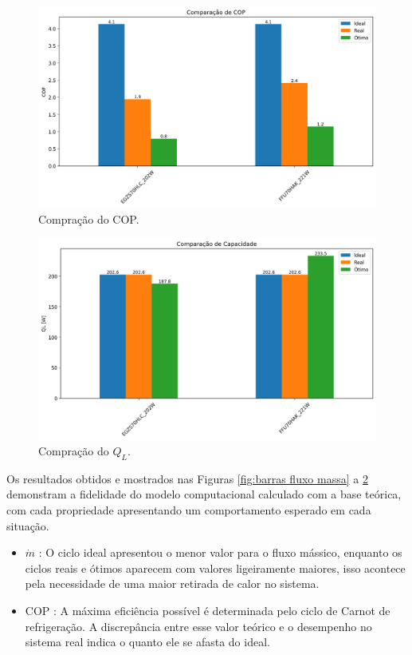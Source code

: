 \newpage

\begin{figure}[ht]
    \centering
    \includegraphics[width=0.8\linewidth]{Imagens/Desenvolvimento/barras_COP.png}
    \caption{Compração do COP.}
    \label{fig:barras COP}
\end{figure}

\begin{figure}[ht]
    \centering
    \includegraphics[width=0.8\linewidth]{Imagens/Desenvolvimento/barras_QL.png}
    \caption{Compração do $Q_L$.}
    \label{fig:barras Ql}
\end{figure}



Os resultados obtidos e mostrados nas Figuras \ref{fig:barras fluxo massa} a \ref{fig:barras Ql} demonstram a fidelidade do modelo computacional calculado com a base teórica, com  cada propriedade apresentando um comportamento esperado em cada situação.

    \begin{itemize}
        \item $\dot{m}$ : O ciclo ideal apresentou o menor valor para o fluxo mássico, enquanto os ciclos reais e ótimos aparecem com valores ligeiramente maiores, isso acontece pela necessidade de uma maior retirada de calor no sistema.
        \item COP : A máxima eficiência possível é determinada pelo ciclo de Carnot de refrigeração. A discrepância entre esse valor teórico e o desempenho no sistema real indica o quanto ele se afasta do ideal.
    \end{itemize}

